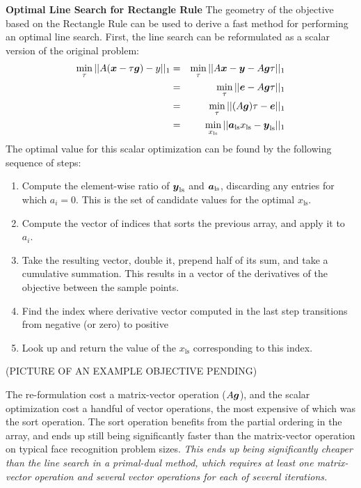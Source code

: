 
{\bf Optimal Line Search for Rectangle Rule} The geometry of the objective
based on the Rectangle Rule can be used to derive a fast method for performing
an optimal line search.  First, the line search can be reformulated as a scalar
version of the original problem:
\begin{eqnarray*}
\min_{\tau}{||A ({\boldsymbol{x}} - \tau \boldsymbol{g})-y||_1} &=& \min_{\tau} ||A{\boldsymbol{x}} - {\boldsymbol{y}} - A \boldsymbol{g} \tau||_1 \\
&=& \min_{\tau} ||\boldsymbol{e} - A \boldsymbol{g} \tau||_1 \\
&=& \min_{\tau} ||(A\boldsymbol{g}) \tau - \boldsymbol{e}||_1 \\
&=& \min_{x_{\textrm{ls}}} ||\boldsymbol{a}_{\textrm{ls}} x_{\textrm{ls}} - {\boldsymbol{y}}_{\textrm{ls}}||_1
\end{eqnarray*}
The optimal value for this scalar optimization can be found by the following sequence of steps:
\begin{enumerate}
\item Compute the element-wise ratio of ${\boldsymbol{y}}_{\textrm{ls}}$ and $\boldsymbol{a}_{\textrm{ls}}$, discarding any entries for which $a_i = 0$.  This is the set of candidate values for the optimal $x_{\textrm{ls}}$.
\item Compute the vector of indices that sorts the previous array, and apply it to $a_i$.
\item Take the resulting vector, double it, prepend half of its sum, and take a cumulative summation.  This results in a vector of the derivatives of the objective between the sample points. 
\item Find the index where derivative vector computed in the last step transitions from negative (or zero) to positive
\item Look up and return the value of the $x_{\textrm{ls}}$ corresponding to this index.
\end{enumerate}
(PICTURE OF AN EXAMPLE OBJECTIVE PENDING)

The re-formulation cost a matrix-vector operation ($A\boldsymbol{g}$), and the scalar
optimization cost a handful of vector operations, the most expensive of which
was the sort operation.  The sort operation benefits from the partial ordering
in the array, and ends up still being significantly faster than the
matrix-vector operation on typical face recognition problem sizes. {\em This
ends up being significantly cheaper than the line search in a primal-dual
method, which requires at least one matrix-vector operation and several vector
operations for each of several iterations. }

